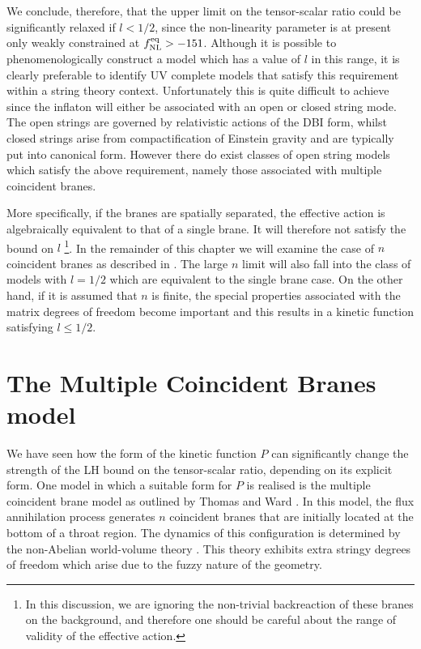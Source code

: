 We conclude, therefore, that 
the upper limit on the tensor-scalar ratio could be significantly 
relaxed if $l <1/2$, since the non-linearity parameter is at present only 
weakly constrained at $f_{\mathrm{NL}}^{\mathrm{eq}} >-151$. Although it is possible 
to phenomenologically construct a model which has a value of $l$ in this 
range, it is clearly preferable to identify  UV complete models
that satisfy this requirement within a string theory context. 
Unfortunately this is quite difficult to achieve since the inflaton 
will either be associated with an open or closed string mode. 
The open strings are governed by relativistic actions of the 
DBI form, whilst closed strings arise from compactification of Einstein gravity
and are typically put into canonical form.
However there do exist classes of open string
models which satisfy the above requirement, 
namely those associated with multiple coincident branes.


More specifically, if the branes are
spatially separated, the effective action is algebraically equivalent 
to that of a single brane. It will therefore not satisfy the 
bound on $l$ \footnote{In this discussion, we are ignoring 
the non-trivial backreaction of these branes on the background, and therefore 
one should be careful about the range of validity of the effective action.}. 
In the remainder of this chapter we will examine the case of $n$ coincident
branes as described in . The large $n$ limit will also
fall into the class of models with $l=1/2$ which are equivalent to the single
brane case. On the other hand, if it is assumed that 
$n$ is finite, the special properties associated with the 
matrix degrees of freedom become important and this 
results in a kinetic function satisfying $l \le 1/2$.



% 
% 
% 
\section{The Multiple Coincident Branes model} 
\label{sec:multibranes-multi}


We have seen how the form of the kinetic function
$P$ can significantly change the
strength of the LH bound on the tensor-scalar ratio, depending on its explicit
form. One model in which a suitable form for 
$P$ is realised is the multiple coincident
brane model as outlined by Thomas and Ward \cite{thomasward}.
In this model, the flux annihilation process 
generates $n$ coincident branes that are initially located at the 
bottom of a throat region. The dynamics of this configuration
is determined by the non-Abelian world-volume theory \cite{myers1,myers2}. 
This theory exhibits extra stringy degrees of freedom which arise due to the 
fuzzy nature of the geometry.

